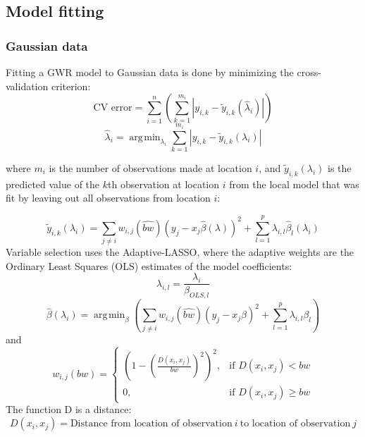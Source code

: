 \documentclass[10pt]{amsart}
\DeclareMathOperator*{\argmin}{\arg\!\min}
\begin{document}
		
	\subsection{Model fitting}
		\subsubsection{Gaussian data}
		Fitting a GWR model to Gaussian data is done by minimizing the cross-validation criterion:
		\[
			\mbox{CV error} = \sum_{i = 1}^n \left( \sum_{k=1}^{m_i} |y_{i,k}-\tilde{y}_{i,k}(\hat{\lambda}_i)| \right)
		\]		
		\[
			\hat{\lambda}_i = \argmin_{\lambda_i} \sum_{k=1}^{m_i} |y_{i,k}-\tilde{y}_{i,k}(\lambda_i)|
		\]		

		where $m_i$ is the number of observations made at location $i$, and $\tilde{y}_{i,k}(\lambda_i)$ is the predicted value of the $k$th observation at location $i$ from the local model that was fit by leaving out all observations from location $i$:
		
		\[
			\tilde{y}_{i,k}(\lambda_i) = \sum_{j \ne i} w_{i,j}(\hat{bw})(y_j - x_j \hat{\beta}(\lambda))^2  +  \sum_{l=1}^p \lambda_{i,l} \hat{\beta}_l(\lambda_i)
		\]
		Variable selection uses the Adaptive-LASSO, where the adaptive weights are the Ordinary Least Squares (OLS) estimates of the model coefficients:
		\[
			\lambda_{i,l} = \frac{\lambda_i}{\beta_{OLS, l}}
		\]
		\[
			\hat{\beta}(\lambda_i) = \argmin_\beta \left( \sum_{j \ne i} w_{i,j}(\hat{bw})(y_j - x_j \beta)^2  +  \sum_{l=1}^p \lambda_{i,l} \beta_l \right)
		\]
		and		
		\[
			w_{i,j}(bw) =  \begin{cases} (1-(\frac{D(x_i,x_j)}{bw})^2)^2, & \mbox{if } D(x_i,x_j) < bw \\
			0, & \mbox{if }D(x_i,x_j) \ge bw \end{cases}
		\]
		The function D is a distance:
		\[
			D(x_i,x_j) = \mbox{Distance from location of observation} \: i \: \mbox{to location of observation} \: j
		\]
		
\end{document}
